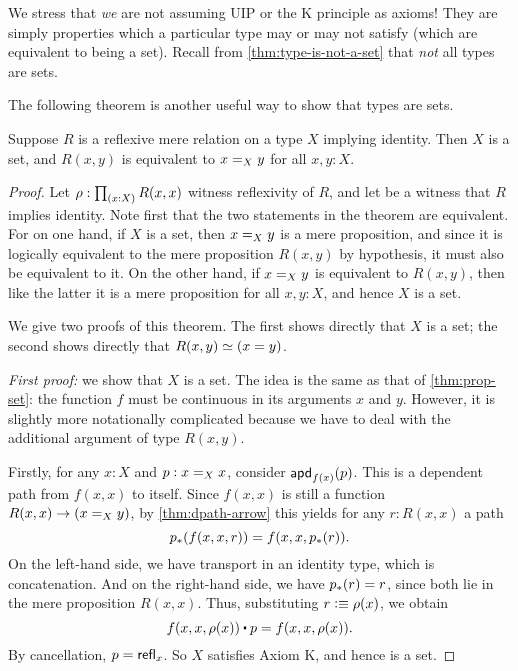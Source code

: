 We stress that \emph{we} are not assuming UIP or the K principle as axioms!
They are simply properties which a particular type may or may not satisfy (which are equivalent to being a set).
Recall from \cref{thm:type-is-not-a-set} that \emph{not} all types are sets.

The following theorem is another useful way to show that types are sets.

\begin{thm}\label{thm:h-set-refrel-in-paths-sets}
  Suppose $R$ is a reflexive mere relation on a type $X$ implying identity.
  Then $X$ is a set, and $R(x,y)$ is equivalent to $\id[X]{x}{y}$ for all $x,y:X$.
\end{thm}

\begin{proof}
  Let $\rho : \prd{x:X} R(x,x)$ witness reflexivity of $R$, and let  be a witness that $R$
implies identity.
  Note first that the two statements in the theorem are equivalent.
  For on one hand, if $X$ is a set, then $\id[X]xy$ is a mere proposition, and since it is logically equivalent to the mere proposition
$R(x,y)$ by hypothesis, it must also be equivalent to it.
  On the other hand, if $\id[X]xy$ is equivalent to $R(x,y)$, then like the latter it is a mere proposition for all $x,y:X$, and hence $X$
is a set.

  We give two proofs of this theorem.
  The first shows directly that $X$ is a set; the second shows directly that $R(x,y)\eqvsym (x=y)$.

  \emph{First proof:} we show that $X$ is a set.
  The idea is the same as that of \cref{thm:prop-set}: the function $f$ must be continuous in its arguments $x$ and $y$.
  However, it is slightly more notationally complicated because we have to deal with the additional argument of type $R(x,y)$.

  Firstly, for any $x:X$ and $p:\id[X]xx$, consider $\apdfunc{f(x)}(p)$.
  This is a dependent path from $f(x,x)$ to itself.
  Since $f(x,x)$ is still a function $R(x,x) \to (\id[X]xy)$, by \cref{thm:dpath-arrow} this yields for any $r:R(x,x)$ a path
  \[\trans{p}{f(x,x,r)} = f(x,x,\trans{p}r).
  \]
  On the left-hand side, we have transport in an identity type, which is concatenation.
  And on the right-hand side, we have $\trans{p}r = r$, since both lie in the mere proposition $R(x,x)$.
  Thus, substituting $r\defeq \rho(x)$, we obtain
  \[ f(x,x,\rho(x)) \ct p = f(x,x,\rho(x)). \]
  By cancellation, $p=\refl{x}$.
  So $X$ satisfies Axiom K, and hence is a set.


\end{proof}
